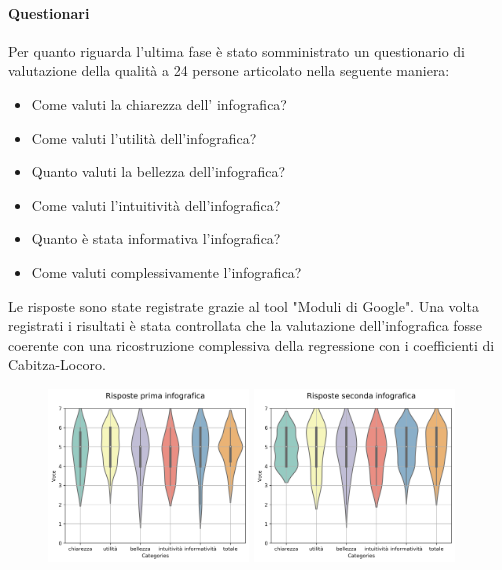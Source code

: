 \documentclass[10pt, a4paper,openany]{article}
\begin{document}
\paragraph{Questionari} Per quanto riguarda l'ultima fase è stato somministrato un questionario di valutazione della qualità a 24 persone articolato nella seguente maniera:
\begin{itemize}
	\item Come valuti la chiarezza dell' infografica?
	\item Come valuti l'utilità dell'infografica?
	\item Quanto valuti la bellezza dell'infografica?
	\item Come valuti l'intuitività dell'infografica?
	\item Quanto è stata informativa l'infografica?
	\item Come valuti complessivamente l'infografica?
\end{itemize}
Le risposte sono state registrate grazie al tool "Moduli di Google". Una volta registrati i risultati è stata controllata che la valutazione dell'infografica fosse coerente con una ricostruzione complessiva della regressione con i coefficienti di Cabitza-Locoro.
\begin{figure}[H]
   \includegraphics[width=0.475\textwidth]{../quality/risposte_violin_plot_first.png}
   \hfill
   \includegraphics[width=0.475\textwidth]{../quality/risposte_violin_plot_second.png}
\end{figure}
\end{document}
